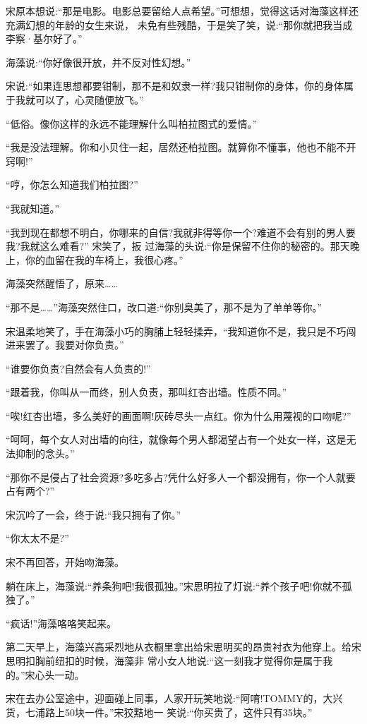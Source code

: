 \documentclass[11pt,a4paper,onecolumn]{article}
\begin{document}
宋原本想说:``那是电影。电影总要留给人点希望。''可想想，觉得这话对海藻这样还充满幻想的年龄的女生来说，
未免有些残酷，于是笑了笑，说:``那你就把我当成李察·基尔好了。''

海藻说:``你好像很开放，并不反对性幻想。''

宋说:``如果连思想都要钳制，那不是和奴隶一样?我只钳制你的身体，你的身体属于我就可以了，心灵随便放飞。''

``低俗。像你这样的永远不能理解什么叫柏拉图式的爱情。''

``我是没法理解。你和小贝住一起，居然还柏拉图。就算你不懂事，他也不能不开窍啊!''

``哼，你怎么知道我们柏拉图?''

``我就知道。''

``我到现在都想不明白，你哪来的自信?我就非得等你一个?难道不会有别的男人要我?我就这么难看?'' 宋笑了，扳
过海藻的头说:``你是保留不住你的秘密的。那天晚上，你的血留在我的车椅上，我很心疼。''

海藻突然醒悟了，原来……

``那不是……''海藻突然住口，改口道:``你别臭美了，那不是为了单单等你。''

宋温柔地笑了，手在海藻小巧的胸脯上轻轻揉弄，``我知道你不是，我只是不巧闯进来罢了。我要对你负责。''

``谁要你负责?自然会有人负责的!''

``跟着我，你叫从一而终，别人负责，那叫红杏出墙。性质不同。''

``唉!红杏出墙，多么美好的画面啊!灰砖尽头一点红。你为什么用蔑视的口吻呢?''

``呵呵，每个女人对出墙的向往，就像每个男人都渴望占有一个处女一样，这是无法抑制的念头。''

``那你不是侵占了社会资源?多吃多占?凭什么好多人一个都没拥有，你一个人就要占有两个?''

宋沉吟了一会，终于说:``我只拥有了你。''

``你太太不是?''

宋不再回答，开始吻海藻。

躺在床上，海藻说:``养条狗吧!我很孤独。''宋思明拉了灯说:``养个孩子吧!你就不孤独了。''

``疯话!''海藻咯咯笑起来。

第二天早上，海藻兴高采烈地从衣橱里拿出给宋思明买的昂贵衬衣为他穿上。给宋思明扣胸前纽扣的时候，海藻非
常小女人地说:``这一刻我才觉得你是属于我的。''宋心头一动。

宋在去办公室途中，迎面碰上同事，人家开玩笑地说:``阿唷!TOMMY的，大兴货，七浦路上50块一件。''宋狡黠地一
笑说:``你买贵了，这件只有35块。''
\end{document}
